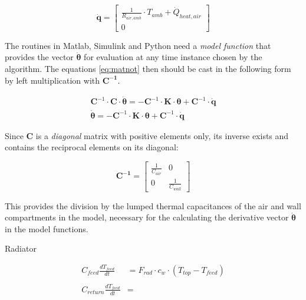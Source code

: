 \begin{equation}
	\mathbf{\dot{q}} =
	\begin{bmatrix}
		\frac{1}{R_{air, amb}} \cdot T_{amb} + \dot{Q}_{heat, air} \\
		0
	\end{bmatrix}
\end{equation}



The routines in Matlab, Simulink and Python need a \emph{model function} that provides the vector $\boldsymbol{\dot{\theta}}$ for evaluation at any time instance chosen by the algorithm. The equations \eqref{eq:matnot} then should be cast in the following form by left multiplication with $\mathbf{C^{-1}}$.

\begin{subequations}
	\label{eq:matnot_ivp}
	\begin{align}
		\mathbf{C}^{-1} \cdot \mathbf{C} \cdot \boldsymbol{\dot{\theta}} = - \mathbf{C}^{-1} \cdot \mathbf{K} \cdot \boldsymbol{\theta} + \mathbf{C}^{-1} \cdot \mathbf{\dot{q}} \\ 
		\boldsymbol{\dot{\theta}} = - \mathbf{C}^{-1} \cdot \mathbf{K} \cdot \boldsymbol{\theta} + \mathbf{C}^{-1} \cdot \mathbf{\dot{q}}
	\end{align}
\end{subequations}

Since $\mathbf{C}$ is a \emph{diagonal} matrix with positive elements only, its inverse exists and contains the reciprocal elements on its diagonal:

\begin{equation}
	\mathbf{C^{-1}} =
	\begin{bmatrix}
		\frac{1}{C_{air}} & 0 \\
		0 &  \frac{1}{C_{wall}}
	\end{bmatrix}
\end{equation}

This provides the division by the lumped thermal capacitances of the air and wall compartments in the model, necessary for the calculating the derivative vector $\boldsymbol{\dot{\theta}}$ in the model functions. 

Radiator

\begin{equation}
	\begin{aligned}
		C_{feed}\frac{dT_{feed}}{dt} &= F_{rad} \cdot c_w \cdot (T_{top}- T_{feed})
		\\ \\
		C_{return}\frac{dT_{feed}}{dt} &= 
	\end{aligned}
\end{equation} 


